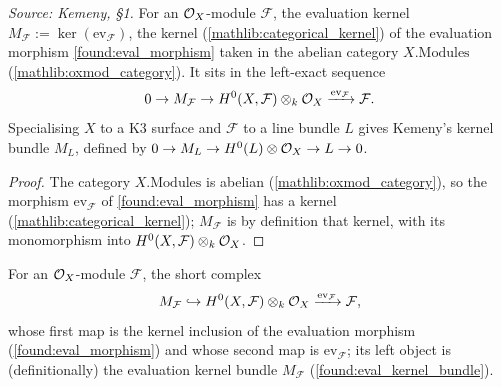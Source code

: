 \begin{definition}
  \label{found:eval_kernel_bundle}
  \textit{Source: Kemeny, \S1.}
  For an \(\mathcal{O}_X\)-module \(\mathcal F\), the evaluation kernel
  \(M_{\mathcal F}:=\ker(\mathrm{ev}_{\mathcal F})\), the kernel
  (\cref{mathlib:categorical_kernel}) of the evaluation morphism
  \cref{found:eval_morphism} taken in the abelian category \(X.\mathrm{Modules}\)
  (\cref{mathlib:oxmod_category}).  It sits in the left-exact sequence
  \[
    0\to M_{\mathcal F}\to H^0(X,\mathcal F)\otimes_k\mathcal{O}_X
       \xrightarrow{\mathrm{ev}_{\mathcal F}}\mathcal F .
  \]
  Specialising \(X\) to a K3 surface and \(\mathcal F\) to a line bundle \(L\) gives
  Kemeny's kernel bundle \(M_L\), defined by
  \(0\to M_L\to H^0(L)\otimes\mathcal{O}_X\to L\to 0\).
\end{definition}

\begin{proof}
  \leanok
  The category \(X.\mathrm{Modules}\) is abelian (\cref{mathlib:oxmod_category}), so
  the morphism \(\mathrm{ev}_{\mathcal F}\) of \cref{found:eval_morphism} has a kernel
  (\cref{mathlib:categorical_kernel}); \(M_{\mathcal F}\) is by definition that kernel,
  with its monomorphism into \(H^0(X,\mathcal F)\otimes_k\mathcal{O}_X\).
\end{proof}

\begin{definition}
  \label{found:eval_short_complex}
  For an \(\mathcal{O}_X\)-module \(\mathcal F\), the short complex
  \[
    M_{\mathcal F}\hookrightarrow H^0(X,\mathcal F)\otimes_k\mathcal{O}_X
       \xrightarrow{\mathrm{ev}_{\mathcal F}}\mathcal F ,
  \]
  whose first map is the kernel inclusion of the evaluation morphism
  (\cref{found:eval_morphism}) and whose second map is \(\mathrm{ev}_{\mathcal F}\); its
  left object is (definitionally) the evaluation kernel bundle \(M_{\mathcal F}\)
  (\cref{found:eval_kernel_bundle}).
\end{definition}

